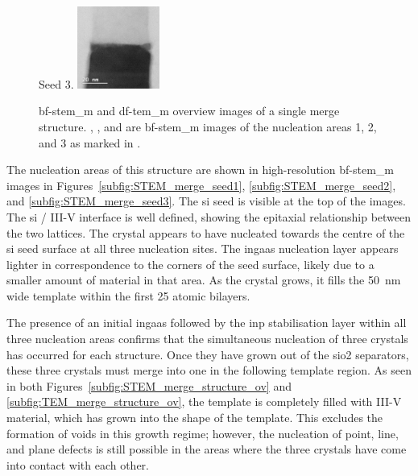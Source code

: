 \begin{figure}
{        Seed 3.
        \label{subfig:STEM_merge_seed3}
    }{
        \includegraphics[width=0.24\textwidth]{4_Properties/Fig/STEM_merge_seed3.pdf}
    }
    \caption{ \acs{bf}-\acs{stem_m} and  \acs{df}-\acs{tem_m} overview images of a single merge structure. , , and  are \acs{bf}-\acs{stem_m} images of the nucleation areas 1, 2, and 3 as marked in .}
    \label{fig:merge_ov_seeds}
\end{figure}

The nucleation areas of this structure are shown in high-resolution \acs{bf}-\acs{stem_m} images in Figures~\ref{subfig:STEM_merge_seed1}, \ref{subfig:STEM_merge_seed2}, and \ref{subfig:STEM_merge_seed3}. The \acl{si} seed is visible at the top of the images. The \acs{si} / III-V interface is well defined, showing the epitaxial relationship between the two lattices. The crystal appears to have nucleated towards the centre of the \acs{si} seed surface at all three nucleation sites. The \acs{ingaas} nucleation layer appears lighter in correspondence to the corners of the seed surface, likely due to a smaller amount of material in that area. As the crystal grows, it fills the \qty{50}{\nano\metre} wide template within the first 25 atomic bilayers.

The presence of an initial \acs{ingaas} followed by the \acs{inp} stabilisation layer within all three nucleation areas confirms that the simultaneous nucleation of three crystals has occurred for each structure. Once they have grown out of the \acs{sio2} separators, these three crystals must merge into one in the following template region. As seen in both Figures~\ref{subfig:STEM_merge_structure_ov} and \ref{subfig:TEM_merge_structure_ov}, the template is completely filled with III-V material, which has grown into the shape of the template. This excludes the formation of voids in this growth regime; however, the nucleation of point, line, and plane defects is still possible in the areas where the three crystals have come into contact with each other. 


